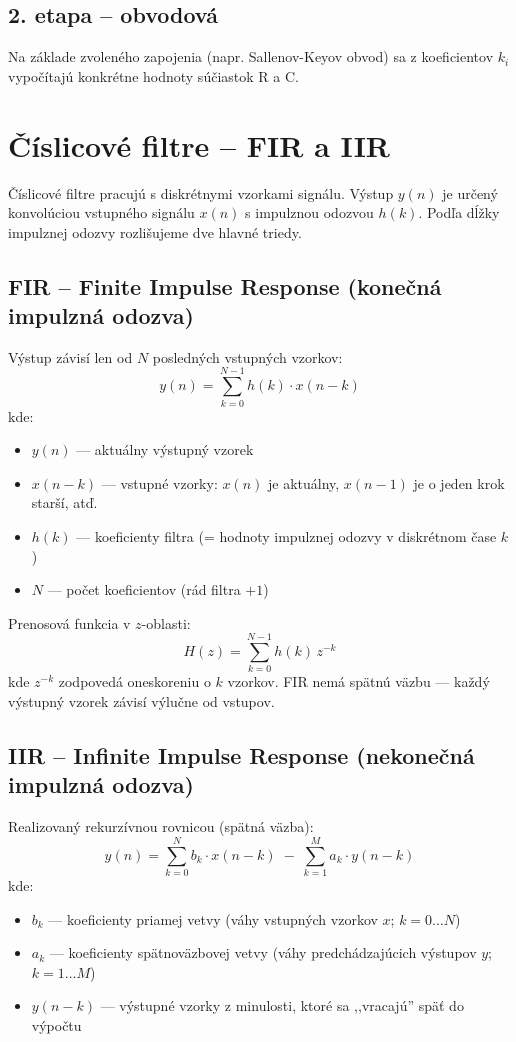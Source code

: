 \subsection{2. etapa -- obvodová}

Na základe zvoleného zapojenia (napr. Sallenov-Keyov obvod) sa z koeficientov
$k_i$ vypočítajú konkrétne hodnoty súčiastok R a C.

\section{Číslicové filtre -- FIR a IIR}

Číslicové filtre pracujú s diskrétnymi vzorkami signálu. Výstup $y(n)$ je
určený konvolúciou vstupného signálu $x(n)$ s impulznou odozvou $h(k)$.
Podľa dĺžky impulznej odozvy rozlišujeme dve hlavné triedy.

\subsection{FIR -- Finite Impulse Response (konečná impulzná odozva)}

Výstup závisí len od $N$ posledných vstupných vzorkov:
\[
  y(n) = \sum_{k=0}^{N-1} h(k) \cdot x(n-k)
\]
kde:
\begin{itemize}
  \item $y(n)$ --- aktuálny výstupný vzorek
  \item $x(n-k)$ --- vstupné vzorky: $x(n)$ je aktuálny, $x(n-1)$ je
        o jeden krok starší, atď.
  \item $h(k)$ --- koeficienty filtra (= hodnoty impulznej odozvy
        v diskrétnom čase $k$)
  \item $N$ --- počet koeficientov (rád filtra $+ 1$)
\end{itemize}

Prenosová funkcia v $z$-oblasti:
\[
  H(z) = \sum_{k=0}^{N-1} h(k)\, z^{-k}
\]
kde $z^{-k}$ zodpovedá oneskoreniu o $k$ vzorkov. FIR nemá spätnú väzbu
--- každý výstupný vzorek závisí výlučne od vstupov.

\subsection{IIR -- Infinite Impulse Response (nekonečná impulzná odozva)}

Realizovaný rekurzívnou rovnicou (spätná väzba):
\[
  y(n) = \sum_{k=0}^{N} b_k \cdot x(n-k) \;-\; \sum_{k=1}^{M} a_k \cdot y(n-k)
\]
kde:
\begin{itemize}
  \item $b_k$ --- koeficienty priamej vetvy (váhy vstupných vzorkov $x$;
        $k = 0 \ldots N$)
  \item $a_k$ --- koeficienty spätnoväzbovej vetvy (váhy predchádzajúcich
        výstupov $y$; $k = 1 \ldots M$)
  \item $y(n-k)$ --- výstupné vzorky z minulosti, ktoré sa ,,vracajú'' späť
        do výpočtu
\end{itemize}

